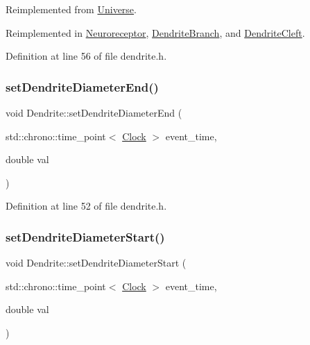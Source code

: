 Reimplemented from \hyperlink{class_universe_aa22202ae740eb1355529afcb13285e91}{Universe}.



Reimplemented in \hyperlink{class_neuroreceptor_a0660a316ef44cf723509f720acd16f24}{Neuroreceptor}, \hyperlink{class_dendrite_branch_a2ce03fbad4a70564eeaafb62debd4d74}{Dendrite\+Branch}, and \hyperlink{class_dendrite_cleft_a428b8e5117f381a382e0071b936d42a1}{Dendrite\+Cleft}.



Definition at line 56 of file dendrite.\+h.

\mbox{\label{class_dendrite_ada331daa4464ae007b3f77612aa46937}} 
\subsubsection{\texorpdfstring{set\+Dendrite\+Diameter\+End()}{setDendriteDiameterEnd()}}
{\footnotesize\ttfamily void Dendrite\+::set\+Dendrite\+Diameter\+End (\begin{DoxyParamCaption}\item[{std\+::chrono\+::time\+\_\+point$<$ \hyperlink{universe_8h_a0ef8d951d1ca5ab3cfaf7ab4c7a6fd80}{Clock} $>$}]{event\+\_\+time,  }\item[{double}]{val }\end{DoxyParamCaption})\hspace{0.3cm}{\ttfamily [inline]}}



Definition at line 52 of file dendrite.\+h.

\mbox{\label{class_dendrite_af33658a5420b56cfd321d75ae5784302}} 
\subsubsection{\texorpdfstring{set\+Dendrite\+Diameter\+Start()}{setDendriteDiameterStart()}}
{\footnotesize\ttfamily void Dendrite\+::set\+Dendrite\+Diameter\+Start (\begin{DoxyParamCaption}\item[{std\+::chrono\+::time\+\_\+point$<$ \hyperlink{universe_8h_a0ef8d951d1ca5ab3cfaf7ab4c7a6fd80}{Clock} $>$}]{event\+\_\+time,  }\item[{double}]{val }\end{DoxyParamCaption})\hspace{0.3cm}{\ttfamily [inline]}}



